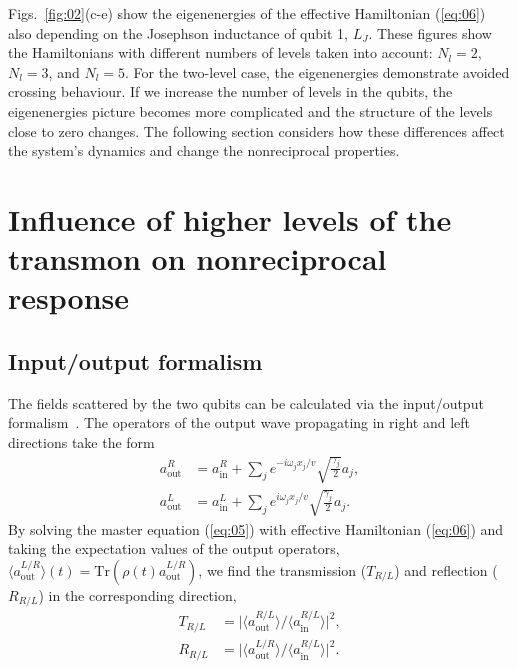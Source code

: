 \documentclass[lettersize,journal]{IEEEtran}
\begin{document}
Figs.~\ref{fig:02}(c-e) show the eigenenergies of the effective Hamiltonian (\ref{eq:06}) also depending on the Josephson inductance of qubit 1, $L_J$.
These figures show the Hamiltonians with different numbers of levels taken into account: $N_l = 2$, $N_l = 3$, and $N_l = 5$.
For the two-level case, the eigenenergies demonstrate avoided crossing behaviour.
If we increase the number of levels in the qubits, the eigenenergies picture becomes more complicated and the structure of the levels close to zero changes.
The following section considers how these differences affect the system's dynamics and change the nonreciprocal properties.

\section{Influence of higher levels of the transmon on nonreciprocal response}

\subsection{Input/output formalism}

The fields scattered by the two qubits can be calculated via the input/output formalism~\cite{gardiner2004quantum}.
The operators of the output wave propagating in right and left directions take the form
\begin{equation}\label{eq:16}
    \begin{aligned}
        a_\mathrm{out}^R &= a_\mathrm{in}^R  + \sum_j e^{-i \omega_j x_j / v} \sqrt{\frac{\gamma_{j}}{2}} a_j, \\
        a_\mathrm{out}^L &= a_\mathrm{in}^L  + \sum_j e^{i \omega_j x_j / v} \sqrt{\frac{\gamma_{j}}{2}} a_j.
    \end{aligned}
\end{equation}
By solving the master equation (\ref{eq:05}) with effective Hamiltonian (\ref{eq:06}) and taking the expectation values of the output operators, $\langle a_\mathrm{out}^{L / R} \rangle(t) = \text{Tr}\left( \rho(t)  a_\mathrm{out}^{L / R} \right) $, we find the transmission ($T_{R/L}$) and reflection ($R_{R/L}$) in the corresponding direction,
\begin{equation}\label{eq:17}
    \begin{aligned}
       T_{R/L} &= \vert \langle a_\mathrm{out}^{R/L} \rangle / \langle a_\mathrm{in}^{R/L} \rangle \vert^2, \\
       R_{R/L} &= \vert \langle a_\mathrm{out}^{L/R} \rangle / \langle a_\mathrm{in}^{R/L} \rangle \vert^2.
    \end{aligned}
\end{equation}
\end{document}
